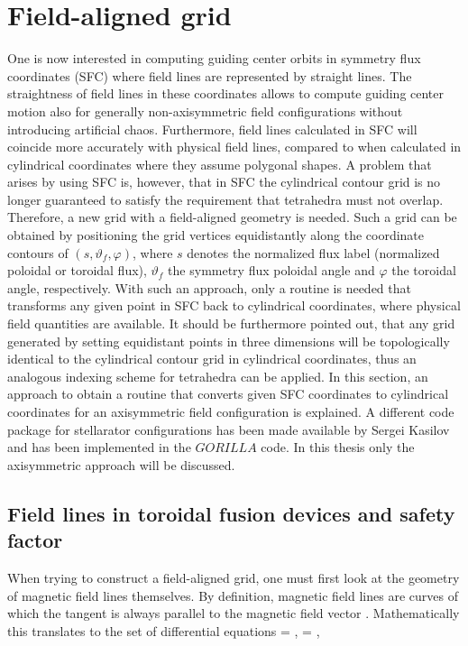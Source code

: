 \documentclass[./main.tex]{subfiles}
\begin{document}
\section{Field-aligned grid}
One is now interested in computing guiding center orbits in symmetry flux coordinates (SFC) where field lines are represented by straight lines. The straightness of field lines in these coordinates allows to compute guiding center motion also for generally non-axisymmetric field configurations without introducing artificial chaos. Furthermore, field lines calculated in SFC will coincide more accurately with physical field lines, compared to when calculated in cylindrical coordinates where they assume polygonal shapes. A problem that arises by using SFC is, however, that in SFC the cylindrical contour grid is no longer guaranteed to satisfy the requirement that tetrahedra must not overlap. Therefore, a new grid with a field-aligned geometry is needed. Such a grid can be obtained by positioning the grid vertices equidistantly along the coordinate contours of $(s,\vartheta_f,\varphi)$, where $s$ denotes the normalized flux label (normalized poloidal or toroidal flux), $\vartheta_f$ the symmetry flux poloidal angle and $\varphi$ the toroidal angle, respectively. With such an approach, only a routine is needed that transforms any given point in SFC back to cylindrical coordinates, where physical field quantities are available. It should be furthermore pointed out, that any grid generated by setting equidistant points in three dimensions will be topologically identical to the cylindrical contour grid in cylindrical coordinates, thus an analogous indexing scheme for tetrahedra can be applied. In this section, an approach to obtain a routine that converts given SFC coordinates to cylindrical coordinates for an axisymmetric field configuration is explained. A different code package for stellarator configurations has been made available by Sergei Kasilov and has been implemented in the $GORILLA$ code. In this thesis only the axisymmetric approach will be discussed. 

\subsection{Field lines in toroidal fusion devices and safety factor}
When trying to construct a field-aligned grid, one must first look at the geometry of magnetic field lines themselves. By definition, magnetic field lines are curves of which the tangent is always parallel to the magnetic field vector \cite{haeseleer}. Mathematically this translates to the set of differential equations
 = , \hspace{0.1cm}  = ,
\ee
\end{document}
